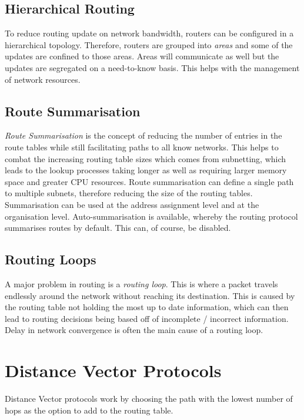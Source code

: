 \subsection{Hierarchical Routing}
To reduce routing update on network bandwidth, routers can be configured in a hierarchical topology. Therefore, routers are grouped into \textit{areas} and some of the updates are confined to those areas. Areas will communicate as well but the updates are segregated on a need-to-know basis. This helps with the management of network resources.

\subsection{Route Summarisation}
\textit{Route Summarisation} is the concept of reducing the number of entries in the route tables while still facilitating paths to all know networks. This helps to combat the increasing routing table sizes which comes from subnetting, which leads to the lookup processes taking longer as well as requiring larger memory space and greater CPU resources. Route summarisation can define a single path to multiple subnets, therefore reducing the size of the routing tables.\\

Summarisation can be used at the address assignment level and at the organisation level. Auto-summarisation is available, whereby the routing protocol summarises routes by default. This can, of course, be disabled. 

\subsection{Routing Loops}
A major problem in routing is a \textit{routing loop}. This is where a packet travels endlessly around the network without reaching its destination. This is caused by the routing table not holding the most up to date information, which can then lead to routing decisions being based off of incomplete / incorrect information. Delay in network convergence is often the main cause of a routing loop.

\section{Distance Vector Protocols}
Distance Vector protocols work by choosing the path with the lowest number of hops as the option to add to the routing table.\\

